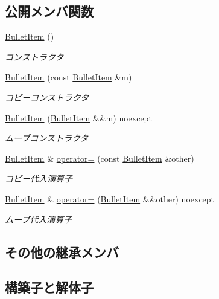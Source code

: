 \subsection*{公開メンバ関数}
\begin{DoxyCompactItemize}
\item 
\mbox{\hyperlink{class_bullet_item_a892fe09364c5392d1be1942b4ce2e466}{Bullet\+Item}} ()
\begin{DoxyCompactList}\small\item\em コンストラクタ \end{DoxyCompactList}\item 
\mbox{\hyperlink{class_bullet_item_aa72f58b22eff8a1a0efad37d9825e866}{Bullet\+Item}} (const \mbox{\hyperlink{class_bullet_item}{Bullet\+Item}} \&m)
\begin{DoxyCompactList}\small\item\em コピーコンストラクタ \end{DoxyCompactList}\item 
\mbox{\hyperlink{class_bullet_item_a6d86025339e83becf65f70b3e4c4ac49}{Bullet\+Item}} (\mbox{\hyperlink{class_bullet_item}{Bullet\+Item}} \&\&m) noexcept
\begin{DoxyCompactList}\small\item\em ムーブコンストラクタ \end{DoxyCompactList}\item 
\mbox{\hyperlink{class_bullet_item}{Bullet\+Item}} \& \mbox{\hyperlink{class_bullet_item_a0c2c6828c04646479a12dae566b41cfb}{operator=}} (const \mbox{\hyperlink{class_bullet_item}{Bullet\+Item}} \&other)
\begin{DoxyCompactList}\small\item\em コピー代入演算子 \end{DoxyCompactList}\item 
\mbox{\hyperlink{class_bullet_item}{Bullet\+Item}} \& \mbox{\hyperlink{class_bullet_item_aa494421c7189fd60911db51628c63455}{operator=}} (\mbox{\hyperlink{class_bullet_item}{Bullet\+Item}} \&\&other) noexcept
\begin{DoxyCompactList}\small\item\em ムーブ代入演算子 \end{DoxyCompactList}\end{DoxyCompactItemize}
\subsection*{その他の継承メンバ}


\subsection{構築子と解体子}
\mbox{\label{class_bullet_item_a892fe09364c5392d1be1942b4ce2e466}} 
